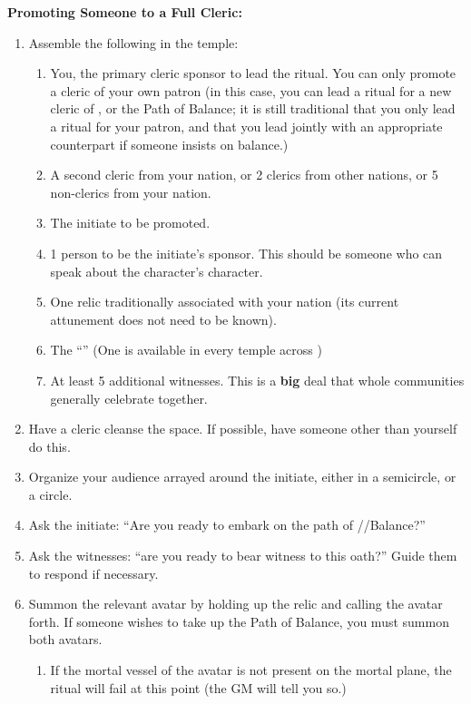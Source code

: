 \documentclass[green]{GL2020}
\begin{document}
\textbf{Promoting Someone to a Full Cleric:}
  \begin{enumerate}
    \item Assemble the following in the temple:
    \begin{enumerate}
      \item You, the primary cleric sponsor to lead the ritual. You can only promote a cleric of your own patron (in this case, you can lead a ritual for a new cleric of \cEbb{}, \cFlow{} or the Path of Balance; it is still traditional that you only lead a ritual for your patron, and that you lead jointly with an appropriate counterpart if someone insists on balance.)
      \item A second cleric from your nation, or  2 clerics from other nations, or 5 non-clerics from your nation.
      \item The initiate to be promoted.
      \item 1 person to be the initiate’s sponsor. This should be someone who can speak about the character’s character.
      \item One relic traditionally associated with your nation (its current attunement does not need to be known).
      \item The ``\iOakStaff{}'' (One is available in every temple across \pEarth{})
      \item At least 5 additional witnesses. This is a \textbf{big} deal that whole communities generally celebrate together.
    \end{enumerate}
    \item Have a cleric cleanse the space. If possible, have someone other than yourself do this.
    \item Organize your audience arrayed around the initiate, either in a semicircle, or a circle.
    \item Ask the initiate: ``Are you ready to embark on the path of \cEbb{} /\cFlow{}/Balance?''
    \item Ask the witnesses: ``are you ready to bear witness to this oath?'' Guide them to respond if necessary.
    \item Summon the relevant avatar by holding up the relic and calling the avatar forth. If someone wishes to take up the Path of Balance, you must summon both avatars.
    \begin{enumerate}
      \item If the mortal vessel of the avatar is not present on the mortal plane, the ritual will fail at this point (the GM will tell you so.)
    \end{enumerate}

\end{enumerate}
\end{document}
